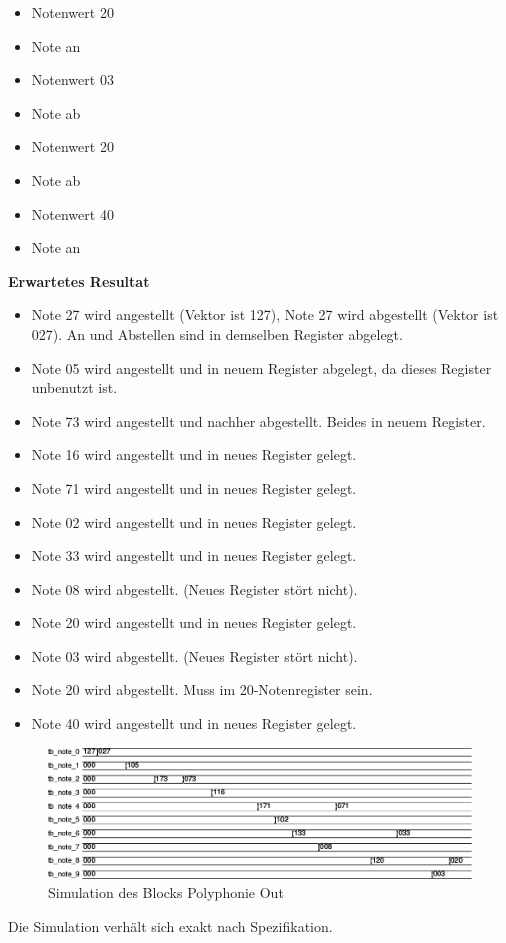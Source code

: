 \begin{itemize}
\item Notenwert 20
\item Note an
\item Notenwert 03
\item Note ab
\item Notenwert 20
\item Note ab
\item Notenwert 40
\item Note an
\end{itemize}

\textbf{Erwartetes Resultat}

\begin{itemize}
\item Note 27 wird angestellt (Vektor ist 127), Note 27 wird abgestellt (Vektor ist 027). An und Abstellen sind in demselben Register abgelegt.
\item Note 05 wird angestellt und in neuem Register abgelegt, da dieses Register unbenutzt ist.
\item Note 73 wird angestellt und nachher abgestellt. Beides in neuem Register.
\item Note 16 wird angestellt und in neues Register gelegt.
\item Note 71 wird angestellt und in neues Register gelegt.
\item Note 02 wird angestellt und in neues Register gelegt.
\item Note 33 wird angestellt und in neues Register gelegt.
\item Note 08 wird abgestellt. (Neues Register stört nicht).
\item Note 20 wird angestellt und in neues Register gelegt.
\item Note 03 wird abgestellt. (Neues Register stört nicht).
\item Note 20 wird abgestellt. Muss im 20-Notenregister sein.
\item Note 40 wird angestellt und in neues Register gelegt.
\end{itemize}

\begin{figure}[H]
	\includegraphics[width=1\textwidth]{images/midi_interface/tb_polyphonie.png}
	\caption{Simulation des Blocks Polyphonie Out }
	\label{fig.polyphnie_simulation}
\end{figure}

Die Simulation verhält sich exakt nach Spezifikation.
